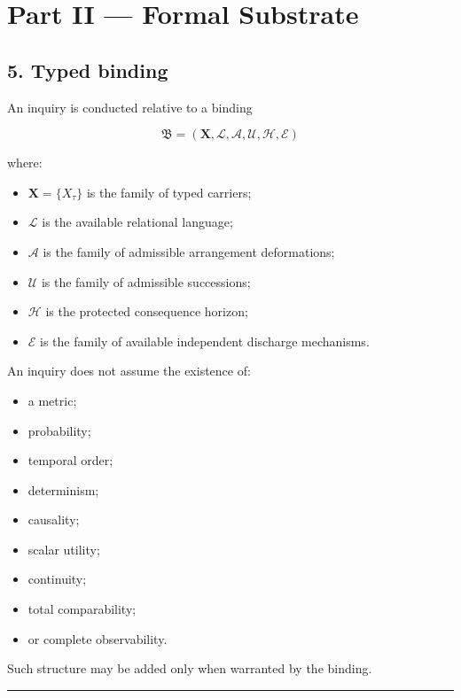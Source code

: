\documentclass[
]{article}
\providecommand{\tightlist}{%
  \setlength{\itemsep}{0pt}\setlength{\parskip}{0pt}}
\begin{document}
\section{Part II --- Formal Substrate}\label{part-ii-formal-substrate}

\subsection{5. Typed binding}\label{typed-binding}

An inquiry is conducted relative to a binding

\[
\boxed{
\mathfrak B
=
(\mathbf X,\mathcal L,\mathcal A,\mathcal U,\mathcal H,\mathcal E)
}
\]

where:

\begin{itemize}
\tightlist
\item
  \(\mathbf X=\{X_\tau\}\) is the family of typed carriers;
\item
  \(\mathcal L\) is the available relational language;
\item
  \(\mathcal A\) is the family of admissible arrangement deformations;
\item
  \(\mathcal U\) is the family of admissible successions;
\item
  \(\mathcal H\) is the protected consequence horizon;
\item
  \(\mathcal E\) is the family of available independent discharge
  mechanisms.
\end{itemize}

An inquiry does not assume the existence of:

\begin{itemize}
\tightlist
\item
  a metric;
\item
  probability;
\item
  temporal order;
\item
  determinism;
\item
  causality;
\item
  scalar utility;
\item
  continuity;
\item
  total comparability;
\item
  or complete observability.
\end{itemize}

Such structure may be added only when warranted by the binding.

\begin{center}\rule{0.5\linewidth}{0.5pt}\end{center}
\end{document}
